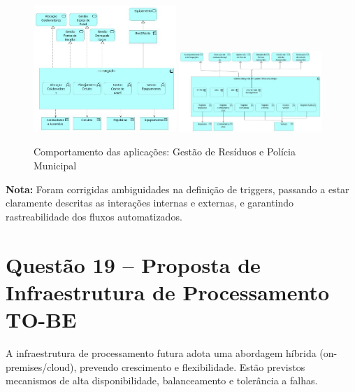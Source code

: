 \documentclass[12pt,a4paper,final]{article}
\begin{document}
    \begin{figure}[H]
        \centering
        \includegraphics[width=0.48\textwidth]{Q18 - Application Behavior - Waste Management.jpg}
        \includegraphics[width=0.48\textwidth]{Q18 - Application Behavior- Municipal Police.jpg}
        \caption{Comportamento das aplicações: Gestão de Resíduos e Polícia Municipal}
        \label{fig:q18-behavior-residuos-pm}
    \end{figure}

    \textbf{Nota:} Foram corrigidas ambiguidades na definição de triggers, passando a estar claramente descritas as interações internas e externas, e garantindo rastreabilidade dos fluxos automatizados.

    \section*{Questão 19 – Proposta de Infraestrutura de Processamento TO-BE}

    A infraestrutura de processamento futura adota uma abordagem híbrida (on-premises/cloud), prevendo crescimento e flexibilidade. Estão previstos mecanismos de alta disponibilidade, balanceamento e tolerância a falhas.
\end{document}
